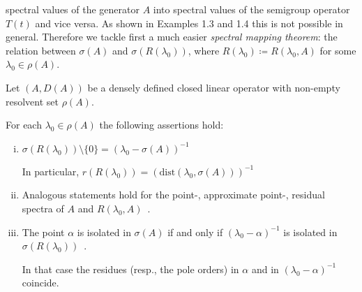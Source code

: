 spectral values of the generator $A$ into spectral values of the semigroup operator $T(t)$ and vice versa.
As shown in Examples 1.3 and 1.4 this is not possible in general.
Therefore we tackle first a much easier \emph{spectral mapping theorem}: the relation between $\sigma(A)$ and $\sigma(R(\lambda_{0}))$, where $R(\lambda_{0}) \coloneqq R(\lambda_{0},A)$ for some $\lambda_{0} \in \rho(A)$.

\begin{proposition}\label{prop:a3-2.5}

Let $(A,D(A))$ be a densely defined closed linear operator with non-empty resolvent set $\rho(A)$.

For each $\lambda_{0} \in \rho(A)$ the following assertions hold:

\begin{enumerate}[(i)]
\item 
$\sigma(R(\lambda_{0})) \setminus \{0\} = (\lambda_{0} - \sigma(A))^{-1}$

In particular, $r(R(\lambda_{0})) = (\text{dist}(\lambda_{0},\sigma(A)))^{-1}$

\item 
Analogous statements hold for the point-, approximate point-, residual spectra of $A$ and $R(\lambda_{0},A)$~.

\item 
The point $\alpha$ is isolated in $\sigma(A)$ if and only if $(\lambda_{0}-\alpha)^{-1}$ is isolated in $\sigma(R(\lambda_{0}))$~.

In that case the residues (resp., the pole orders) in $\alpha$ and in $(\lambda_{0}-\alpha)^{-1}$ coincide.
\end{enumerate}
\end{proposition}

